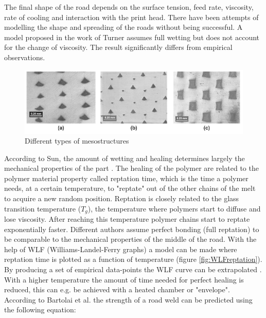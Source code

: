 The final shape of the road depends on the surface tension, feed rate, viscosity, rate of cooling and interaction with the print head. There have been attempts of modelling the shape and spreading of the roads without being successful. A model proposed in the work of Turner \cite{Turner2014AModeling} assumes full wetting but does not account for the change of viscosity. The result significantly differs from empirical observations. 

\begin{figure}[hbt]
    \centering
    \includegraphics[width=1\textwidth]{chapter_2/figures/Mesostructure.PNG}
    \caption{Different types of mesostructures \cite{Rodriguez2001MechanicalInvestigation}}
    \label{fig:mesostructure}
\end{figure}

According to Sun, the amount of wetting and healing determines largely  the mechanical properties of the part \cite{Sun2008}. The healing of the polymer are related to the polymer material property called reptation time, which is the time a polymer needs, at a certain temperature, to "reptate" out of the other chains of the melt to acquire a new random position. Reptation is closely related to the glass transition temperature ($T_g$), the temperature where polymers start to diffuse and lose viscosity. After reaching this temperature polymer chains start to reptate exponentially faster. Different authors \cite{Mcilroy2017DisentanglementManufacturing}  \cite{Hart2018IncreasedAnnealing} \cite{Bartolai2016PredictingManufacturing} assume perfect bonding (full reptation) to be comparable to the mechanical properties of the middle of the road. With the help of WLF (Williams-Landel-Ferry graphs) a model can be made where reptation time is plotted as a function of temperature (figure \ref{fig:WLFreptation}). By producing a set of empirical data-points the WLF curve can be extrapolated \cite{Peterson2019ReviewPerspective}. With a higher temperature the amount of time needed for perfect healing is reduced, this can e.g. be achieved with a heated chamber or "envelope". According to Bartolai et al. \cite{Bartolai2016PredictingManufacturing} the strength of a road weld can be predicted using the following equation:

